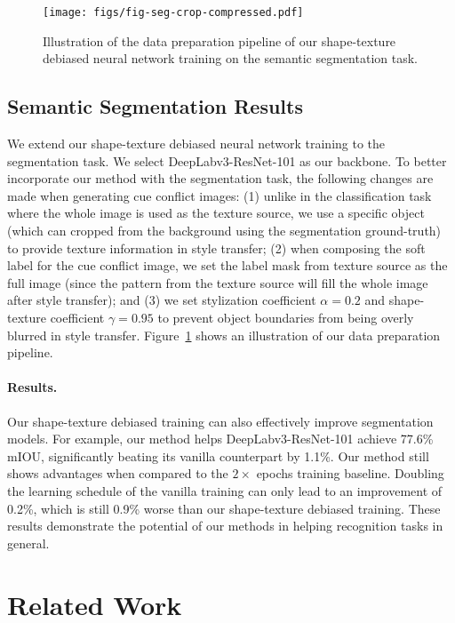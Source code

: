 \documentclass{article} \usepackage{iclr2021_conference,times}
\begin{document}
\begin{figure}[tb]
    \centering
    \texttt{[image: figs/fig-seg-crop-compressed.pdf]}
    \vspace{-2em}
    \caption{Illustration of the data preparation pipeline of our shape-texture debiased neural network training on the semantic segmentation task.}
    \vspace{-1em}
    \label{fig:seg}
\end{figure}

\subsection{Semantic Segmentation Results} \label{sec:exp_seg}
We extend our shape-texture debiased neural network training to the segmentation task. 
We select DeepLabv3-ResNet-101 \citep{chen2017rethinking} as our backbone.
To better incorporate our method with the segmentation task, the following changes are made when generating cue conflict images: (1) unlike in the classification task where the whole image is used as the texture source, we use a specific object (which can cropped from the background using the segmentation ground-truth) to provide texture information in style transfer; (2) when composing the soft label for the cue conflict image, we set the label mask from texture source as the full image (since the pattern from the texture source will fill the whole image after style transfer); 
and (3) we
set stylization coefficient $\alpha=0.2$ and shape-texture coefficient $\gamma=0.95$ to prevent object boundaries from being overly blurred in style transfer. Figure~\ref{fig:seg} shows an illustration of our data preparation pipeline.

\paragraph{Results.} Our shape-texture debiased training can also effectively improve segmentation models. For example, our method helps DeepLabv3-ResNet-101 achieve 77.6\% mIOU, significantly beating its vanilla counterpart by 1.1\%. Our method still shows advantages when compared to the $2\times$ epochs training baseline. Doubling the learning schedule of the vanilla training can only lead to an improvement of 0.2\%, which is still 0.9\% worse than our shape-texture debiased training.
These results demonstrate the potential of our methods in helping recognition tasks in general.

\section{Related Work}
\end{document}
